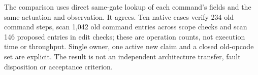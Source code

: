 \documentclass[11pt]{article}
\begin{document}
The comparison uses direct same-gate lookup of each command's
fields and the same actuation and observation. It agrees.
Ten native cases verify 234 old command steps, scan 1,042 old
command entries across scope checks and scan 146 proposed
entries in edit checks; these are operation counts, not execution
time or throughput. Single owner, one active new claim and a closed
old-opcode set are explicit. The result is not an independent
architecture transfer, fault disposition or acceptance criterion.
\end{document}
